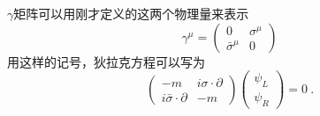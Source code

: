 $\gamma$矩阵可以用刚才定义的这两个物理量来表示
\begin{equation}
\gamma^\mu = \begin{pmatrix}
0 & \sigma^\mu \\
\bar \sigma^\mu & 0 
\end{pmatrix}
\end{equation}
用这样的记号，狄拉克方程可以写为
\begin{equation}
\begin{pmatrix}
-m & i \sigma \cdot \partial \\
i \bar \sigma \cdot \partial & -m 
\end{pmatrix}\begin{pmatrix}
\psi_L \\ \psi_R
\end{pmatrix} = 0~.
\end{equation}


